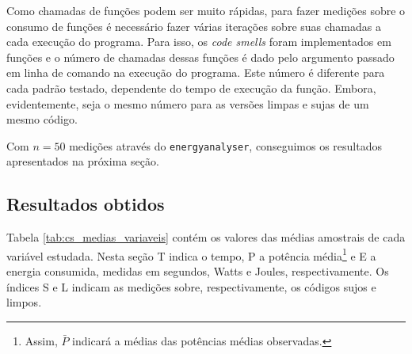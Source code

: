 Como chamadas de funções podem ser muito rápidas, para fazer medições sobre o consumo de funções é necessário fazer várias iterações sobre suas chamadas a cada execução do programa. Para isso, os \emph{code smells} foram implementados em funções e o número de chamadas dessas funções é dado pelo argumento passado em linha de comando na execução do programa. Este número é diferente para cada padrão testado, dependente do tempo de execução da função. Embora, evidentemente, seja o mesmo número para as versões limpas e sujas de um mesmo código.

Com $ n = 50 $ medições através do {\tt energyanalyser}, conseguimos os resultados apresentados na próxima seção.

\subsection{Resultados obtidos}
 Tabela \ref{tab:cs_medias_variaveis} contém os valores das médias amostrais de cada variável estudada. Nesta seção T indica o tempo, P a potência média\footnote{Assim, $ \bar{P} $ indicará a médias das potências médias observadas.} e E a energia consumida, medidas em segundos, Watts e Joules, respectivamente. Os índices S e L indicam as medições sobre, respectivamente, os códigos sujos e limpos.

